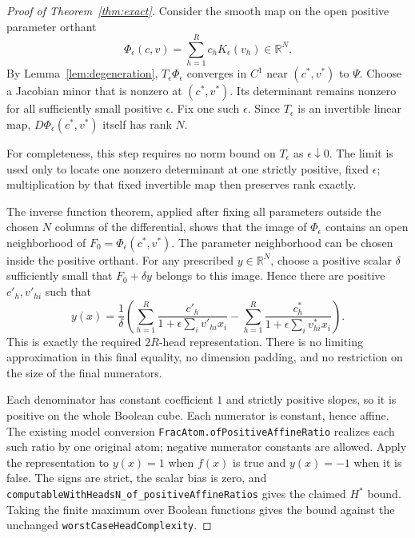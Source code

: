 \documentclass[11pt]{article}
\begin{document}
\begin{proof}[Proof of Theorem~\ref{thm:exact}]
Consider the smooth map on the open positive parameter orthant
\[
 \Phi_\epsilon(c,v)=\sum_{h=1}^R c_h K_\epsilon(v_h)
       \in\mathbb R^N.
\]
By Lemma~\ref{lem:degeneration}, $T_\epsilon\Phi_\epsilon$
converges in $C^1$ near $(c^*,v^*)$ to $\Psi$. Choose a Jacobian
minor that is nonzero at $(c^*,v^*)$. Its determinant remains
nonzero for all sufficiently small positive $\epsilon$.
Fix one such $\epsilon$. Since $T_\epsilon$ is an invertible
linear map, $D\Phi_\epsilon(c^*,v^*)$ itself has rank $N$.

For completeness, this step requires no norm bound on
$T_\epsilon$ as $\epsilon\downarrow0$. The limit is used only
to locate one nonzero determinant at one strictly positive,
fixed $\epsilon$; multiplication by that fixed invertible map
then preserves rank exactly.

The inverse function theorem, applied after fixing all parameters
outside the chosen $N$ columns of the differential, shows that
the image of $\Phi_\epsilon$ contains an open neighborhood of
$F_0=\Phi_\epsilon(c^*,v^*)$. The parameter neighborhood can
be chosen inside the positive orthant. For any prescribed
$y\in\mathbb R^N$, choose a positive scalar $\delta$ sufficiently
small that $F_0+\delta y$ belongs to this image. Hence there are
positive $c'_h,v'_{hi}$ such that
\[
 y(x)=\frac1\delta
  \left(\sum_{h=1}^R
      \frac{c'_h}{1+\epsilon\sum_i v'_{hi}x_i}
      -\sum_{h=1}^R
      \frac{c^*_h}{1+\epsilon\sum_i v^*_{hi}x_i}\right).
\]
This is exactly the required $2R$-head representation. There is
no limiting approximation in this final equality, no dimension
padding, and no restriction on the size of the final numerators.

Each denominator has constant coefficient $1$ and strictly positive
slopes, so it is positive on the whole Boolean cube. Each numerator
is constant, hence affine. The existing model conversion
\texttt{FracAtom.ofPositiveAffineRatio} realizes each such ratio
by one original atom; negative numerator constants are allowed.
Apply the representation to $y(x)=1$ when $f(x)$ is true and
$y(x)=-1$ when it is false. The signs are strict, the scalar bias
is zero, and
\texttt{computableWithHeadsN\_of\_positiveAffineRatios}
gives the claimed $H^*$ bound. Taking the finite maximum over
Boolean functions gives the bound against the unchanged
\texttt{worstCaseHeadComplexity}.
\end{proof}
\end{document}

